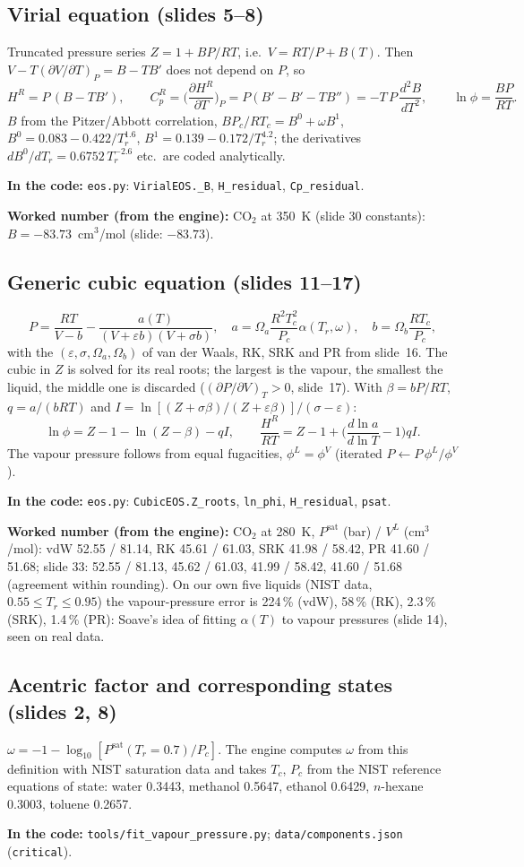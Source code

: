 \documentclass[11pt,a4paper]{article}
\newcommand{\code}[1]{\texttt{\small #1}}
\newcommand{\where}[1]{\par\noindent\textbf{In the code:} #1\par}
\newcommand{\num}[1]{\par\noindent\textbf{Worked number (from the engine):} #1\par}
\begin{document}
\subsection{Virial equation (slides 5--8)}
Truncated pressure series $Z=1+BP/RT$, i.e.\ $V=RT/P+B(T)$. Then $V-T(\partial V/\partial T)_P=B-TB'$ does not
depend on $P$, so
\[
H^R=P\,(B-TB'),\qquad C_p^R=\Big(\frac{\partial H^R}{\partial T}\Big)_P=P(B'-B'-TB'')=-T\,P\,\frac{d^2B}{dT^2},
\qquad \ln\phi=\frac{BP}{RT}.
\]
$B$ from the Pitzer/Abbott correlation, $BP_c/RT_c=B^0+\omega B^1$, $B^0=0.083-0.422/T_r^{1.6}$,
$B^1=0.139-0.172/T_r^{4.2}$; the derivatives $dB^0/dT_r=0.6752\,T_r^{-2.6}$ etc.\ are coded analytically.
\where{\code{eos.py}: \code{VirialEOS.\_B}, \code{H\_residual}, \code{Cp\_residual}.}
\num{CO$_2$ at 350~K (slide 30 constants): $B=-83.73$~cm$^3$/mol (slide: $-83.73$).}

\subsection{Generic cubic equation (slides 11--17)}
\[
P=\frac{RT}{V-b}-\frac{a(T)}{(V+\varepsilon b)(V+\sigma b)},\quad a=\Omega_a\frac{R^2T_c^2}{P_c}\alpha(T_r,\omega),\quad
b=\Omega_b\frac{RT_c}{P_c},
\]
with the $(\varepsilon,\sigma,\Omega_a,\Omega_b)$ of van der Waals, RK, SRK and PR from slide~16. The cubic in
$Z$ is solved for its real roots; the largest is the vapour, the smallest the liquid, the middle one is
discarded ($(\partial P/\partial V)_T>0$, slide~17). With $\beta=bP/RT$, $q=a/(bRT)$ and
$I=\ln[(Z+\sigma\beta)/(Z+\varepsilon\beta)]/(\sigma-\varepsilon)$:
\[
\ln\phi=Z-1-\ln(Z-\beta)-qI,\qquad \frac{H^R}{RT}=Z-1+\Big(\frac{d\ln a}{d\ln T}-1\Big)qI .
\]
The vapour pressure follows from equal fugacities, $\phi^L=\phi^V$ (iterated $P\leftarrow
P\,\phi^L/\phi^V$).
\where{\code{eos.py}: \code{CubicEOS.Z\_roots}, \code{ln\_phi}, \code{H\_residual}, \code{psat}.}
\num{CO$_2$ at 280~K, $P^\mathrm{sat}$ (bar) / $V^L$ (cm$^3$/mol): vdW 52.55 / 81.14, RK 45.61 / 61.03,
SRK 41.98 / 58.42, PR 41.60 / 51.68; slide 33: 52.55 / 81.13, 45.62 / 61.03, 41.99 / 58.42, 41.60 / 51.68
(agreement within rounding). On our own five liquids (NIST data, $0.55\le T_r\le0.95$) the vapour-pressure
error is 224\,\% (vdW), 58\,\% (RK), 2.3\,\% (SRK), 1.4\,\% (PR): Soave's idea of fitting $\alpha(T)$ to
vapour pressures (slide 14), seen on real data.}

\subsection{Acentric factor and corresponding states (slides 2, 8)}
$\omega=-1-\log_{10}[P^\mathrm{sat}(T_r=0.7)/P_c]$. The engine computes $\omega$ from this definition with NIST
saturation data and takes $T_c$, $P_c$ from the NIST reference equations of state:
water 0.3443, methanol 0.5647, ethanol 0.6429, $n$-hexane 0.3003, toluene 0.2657.
\where{\code{tools/fit\_vapour\_pressure.py}; \code{data/components.json} (\code{critical}).}
\end{document}
